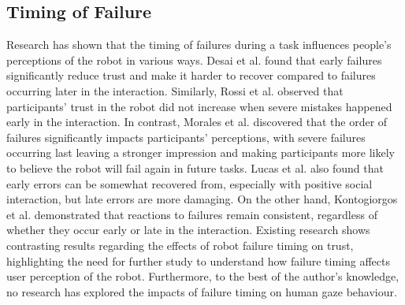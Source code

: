 \subsection{Timing of Failure}
Research has shown that the timing of failures during a task influences people's perceptions of the robot in various ways. Desai et al. \cite{desai_impact_2013} found that early failures significantly reduce trust and make it harder to recover compared to failures occurring later in the interaction. Similarly, Rossi et al. \cite{rossi_how_2017} observed that participants' trust in the robot did not increase when severe mistakes happened early in the interaction. In contrast, Morales et al. \cite{morales_interaction_2019} discovered that the order of failures significantly impacts participants' perceptions, with severe failures occurring last leaving a stronger impression and making participants more likely to believe the robot will fail again in future tasks. Lucas et al. \cite{lucas_getting_2018} also found that early errors can be somewhat recovered from, especially with positive social interaction, but late errors are more damaging. On the other hand, Kontogiorgos et al. \cite{kontogiorgos_systematic_2021} demonstrated that reactions to failures remain consistent, regardless of whether they occur early or late in the interaction. Existing research shows contrasting results regarding the effects of robot failure timing on trust, highlighting the need for further study to understand how failure timing affects user perception of the robot. Furthermore, to the best of the author's knowledge, no research has explored the impacts of failure timing on human gaze behaviour.



